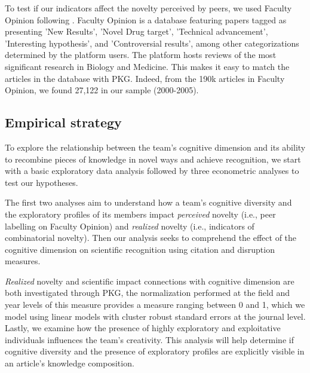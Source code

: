         To test if our indicators affect the novelty perceived by peers, we used Faculty Opinion following \cite{bornmann2019do}. Faculty Opinion is a database featuring papers tagged as presenting 'New Results', 'Novel Drug target', 'Technical advancement', 'Interesting hypothesis', and 'Controversial results', among other categorizations determined by the platform users. The platform hosts reviews of the most significant research in Biology and Medicine. This makes it easy to match the articles in the database with PKG. Indeed, from the 190k articles in Faculty Opinion, we found 27,122 in our sample (2000-2005).

\subsection{Empirical strategy}

        To explore the relationship between the team's cognitive dimension and its ability to recombine pieces of knowledge in novel ways and achieve recognition, we start with a basic exploratory data analysis followed by three econometric analyses to test our hypotheses.
        
        The first two analyses aim to understand how a team's cognitive diversity and the exploratory profiles of its members impact \textit{perceived} novelty (i.e., peer labelling on Faculty Opinion) and \textit{realized} novelty (i.e., indicators of combinatorial novelty). Then our analysis seeks to comprehend the effect of the cognitive dimension on scientific recognition using citation and disruption measures.
        
        \textit{Realized} novelty and scientific impact connections with cognitive dimension are both investigated through PKG, the normalization performed at the field and year levels of this measure provides a measure ranging between 0 and 1, which we model using linear models with cluster robust standard errors at the journal level. Lastly, we examine how the presence of highly exploratory and exploitative individuals influences the team's creativity. This analysis will help determine if cognitive diversity and the presence of exploratory profiles are explicitly visible in an article's knowledge composition.
        
